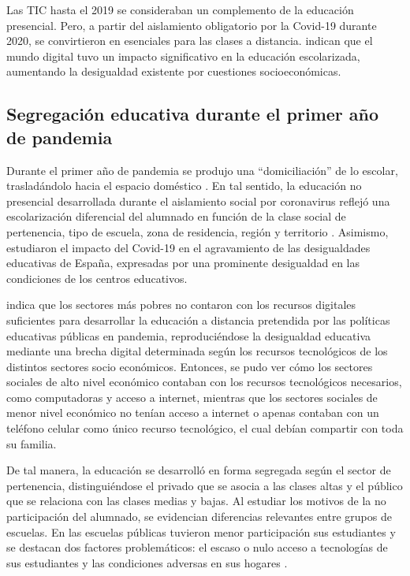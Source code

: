 \documentclass[spanish]{textolivre}
\begin{document}
Las TIC hasta el 2019 se consideraban un complemento de la educación presencial. Pero, a partir del aislamiento obligatorio por la Covid-19 durante 2020, se convirtieron en esenciales para las clases a distancia. \textcite{tiramonti_politicas_2021} indican que el mundo digital tuvo un impacto significativo en la educación escolarizada, aumentando la desigualdad existente por cuestiones socioeconómicas.


\subsection{Segregación educativa durante el primer año de pandemia}\label{sec-fmt-manuscrito}
Durante el primer año de pandemia se produjo una “domiciliación” de lo escolar, trasladándolo hacia el espacio doméstico \cite{dussel_escuela_2020}. En tal sentido, la educación no presencial desarrollada durante el aislamiento social por coronavirus reflejó una escolarización diferencial del alumnado en función de la clase social de pertenencia, tipo de escuela, zona de residencia, región y territorio \cite{cabrera_se_2020}. Asimismo, \textcite{jacovkis_covid-19_2021} estudiaron el impacto del Covid-19 en el agravamiento de las desigualdades educativas de España, expresadas por una prominente desigualdad en las condiciones de los centros educativos.

\textcite{vivanco-saraguro_teleducacion_2020} indica que los sectores más pobres no contaron con los recursos digitales suficientes para desarrollar la educación a distancia pretendida por las políticas educativas públicas en pandemia, reproduciéndose la desigualdad educativa mediante una brecha digital determinada según los recursos tecnológicos de los distintos sectores socio económicos. Entonces, se pudo ver cómo los sectores sociales de alto nivel económico contaban con los recursos tecnológicos necesarios, como computadoras y acceso a internet, mientras que los sectores sociales de menor nivel económico no tenían acceso a internet o apenas contaban con un teléfono celular como único recurso tecnológico, el cual debían compartir con toda su familia.

De tal manera, la educación se desarrolló en forma segregada según el sector de pertenencia, distinguiéndose el privado que se asocia a las clases altas y el público que se relaciona con las clases medias y bajas. Al estudiar los motivos de la no participación del alumnado, se evidencian diferencias relevantes entre grupos de escuelas. En las escuelas públicas tuvieron menor participación sus estudiantes y se destacan dos factores problemáticos: el escaso o nulo acceso a tecnologías de sus estudiantes y las condiciones adversas en sus hogares \cite{romero_escuelas_2021}.
\end{document}
